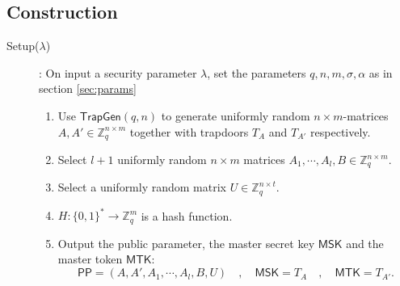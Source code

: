 \documentclass[runningheads]{llncs}
\def\ZZ{\mathbb{Z}}
\def\TrapGen{\mathsf{TrapGen}}
\def\PP{\mathsf{PP}}
\def\MSK{\mathsf{MSK}}
\def\MTK{\mathsf{MTK}}
\begin{document}
	\subsection{Construction}
	\begin{description}
		\item[Setup($\lambda$)]: On input a security parameter $\lambda$, set the parameters $q,n,m,\sigma,\alpha$ as in section \ref{sec:params}
		\begin{enumerate}
			\item Use $\TrapGen(q,n)$ to generate uniformly random $n\times m$-matrices $A, A'\in\ZZ_q^{n\times m}$ together with trapdoors $T_{A}$ and $T_{A'}$ respectively.
			\item Select $l+1$ uniformly random $n\times m$ matrices $A_1,\cdots,A_l,B\in\ZZ_q^{n\times m}$.
			\item Select a uniformly random matrix $U\in\ZZ_q^{n\times t}$.
			\item $H: \{0,1\}^*\to \ZZ_q^m$ is a hash function.
			\item Output the public parameter, the master secret key $\MSK$ and the master token $\MTK$:
			$$\PP=(A,A',A_1,\cdots,A_l,B,U)\quad,\quad \MSK=T_A\quad,\quad\MTK=T_{A'}.$$
		\end{enumerate} 
		

\end{description}
\end{document}
